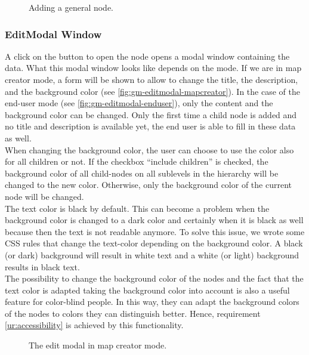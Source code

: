 \begin{figure}[H]
	\centering
	\caption{Adding a general node.}
	\label{fig:gm-add-general}
\end{figure}



\subsubsection{EditModal Window}\label{sec:editmodal}
A click on the button to open the node opens a modal window containing the data. What this modal window looks like depends on the mode. If we are in map creator mode, a form will be shown to allow to change the title, the description, and the background color (see \autoref{fig:gm-editmodal-mapcreator}). In the case of the end-user mode (see \autoref{fig:gm-editmodal-enduser}), only the content and the background color can be changed. Only the first time a child node is added and no title and description is available yet, the end user is able to fill in these data as well.\\

When changing the background color, the user can choose to use the color also for all children or not. If the checkbox ``include children'' is checked, the background color of all child-nodes on all sublevels in the hierarchy will be changed to the new color. Otherwise, only the background color of the current node will be changed.\\

The text color is black by default. This can become a problem when the background color is changed to a dark color and certainly when it is black as well because then the text is not readable anymore. To solve this issue, we wrote some CSS rules that change the text-color depending on the background color. A black (or dark) background will result in white text and a white (or light) background results in black text.\\

The possibility to change the background color of the nodes and the fact that the text color is adapted taking the background color into account is also a useful feature for color-blind people. In this way, they can adapt the background colors of the nodes to colors they can distinguish better. Hence, requirement \ref{ur:accessibility} is achieved by this functionality.

\begin{figure}[H]
	\centering
	\caption{The edit modal in map creator mode.}
	\label{fig:gm-editmodal-mapcreator}
\end{figure}

